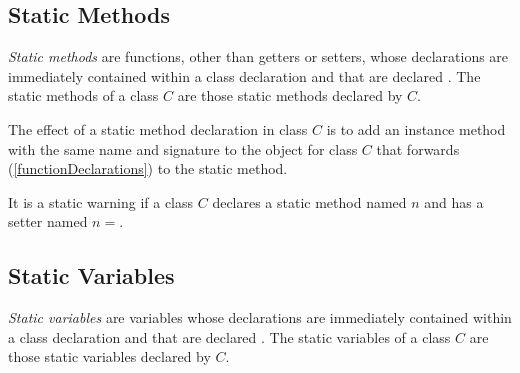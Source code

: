 \documentclass{article}
\begin{document}


\subsection{Static Methods}

\LMHash{}
{\em Static methods} are functions, other than getters or setters, whose declarations are immediately contained within a class declaration and that are declared \STATIC{}.
The static methods of a class $C$ are those static methods declared by $C$.

\LMHash{}
The effect of a static method declaration in class $C$ is to add an instance method with the same name and signature to the  object for class $C$ that forwards (\ref{functionDeclarations}) to the static method.


\LMHash{}
It is a static warning if a class $C$ declares a static method named $n$ and has a setter named $n=$.


\subsection{Static Variables}

\LMHash{}
{\em Static variables} are variables whose declarations are immediately contained within a class declaration and that are declared \STATIC{}.
The static variables of a class $C$ are those static variables declared by $C$.


\end{document}
